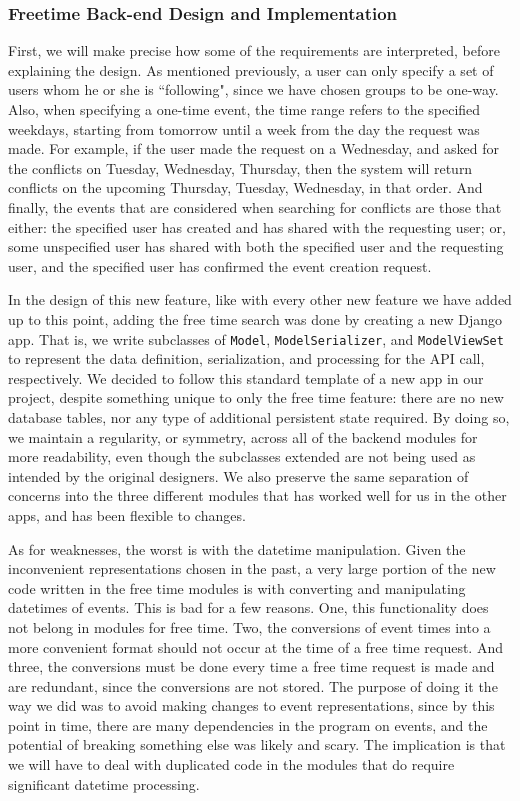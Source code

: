 \documentclass[a4paper]{article}
\begin{document}
\subsubsection{Freetime Back-end Design and Implementation}

First, we will make precise how some of the requirements are interpreted, before explaining the design. As mentioned previously, a user can only specify a set of users whom he or she is ``following", since we have chosen groups to be one-way. Also, when specifying a one-time event, the time range refers to the specified weekdays, starting from tomorrow until a week from the day the request was made. For example, if the user made the request on a Wednesday, and asked for the conflicts on Tuesday, Wednesday, Thursday, then the system will return conflicts on the upcoming Thursday, Tuesday, Wednesday, in that order. And finally, the events that are considered when searching for conflicts are those that either: the specified user has created and has shared with the requesting user; or, some unspecified user has shared with both the specified user and the requesting user, and the specified user has confirmed the event creation request.

In the design of this new feature, like with every other new feature we have added up to this point, adding the free time search was done by creating a new Django app. That is, we write subclasses of {\tt Model}, {\tt ModelSerializer}, and {\tt ModelViewSet} to represent the data definition, serialization, and processing for the API call, respectively. We decided to follow this standard template of a new app in our project, despite something unique to only the free time feature: there are no new database tables, nor any type of additional persistent state required. By doing so, we maintain a regularity, or symmetry, across all of the backend modules for more readability, even though the subclasses extended are not being used as intended by the original designers. We also preserve the same separation of concerns into the three different modules that has worked well for us in the other apps, and has been flexible to changes.

As for weaknesses, the worst is with the datetime manipulation. Given the inconvenient representations chosen in the past, a very large portion of the new code written in the free time modules is with converting and manipulating datetimes of events. This is bad for a few reasons. One, this functionality does not belong in modules for free time. Two, the conversions of event times into a more convenient format should not occur at the time of a free time request. And three, the conversions must be done every time a free time request is made and are redundant, since the conversions are not stored. The purpose of doing it the way we did was to avoid making changes to event representations, since by this point in time, there are many dependencies in the program on events, and the potential of breaking something else was likely and scary. The implication is that we will have to deal with duplicated code in the modules that do require significant datetime processing.
\end{document}

